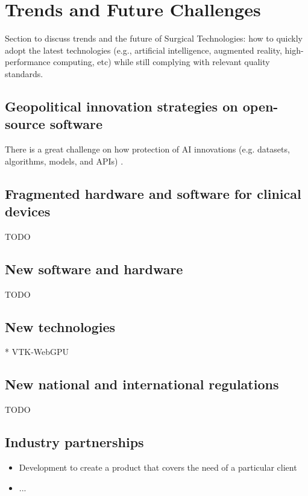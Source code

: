 \documentclass{article}
\begin{document}
\section{Trends and Future Challenges}
Section to discuss trends and the future of Surgical Technologies: how to quickly adopt the latest technologies (e.g., artificial intelligence, augmented reality, high-performance computing, etc) while still complying with relevant quality standards.

\subsection{Geopolitical innovation strategies on open-source software}
There is a great challenge on how protection of AI innovations (e.g. datasets, algorithms, models, and APIs) \cite{munozferrandis2022-open-sourcing-ai}.

\subsection{Fragmented hardware and software for clinical devices}
TODO

\subsection{New software and hardware}
TODO


\subsection{New technologies}
* VTK-WebGPU


\subsection{New national and international regulations}
TODO

\subsection{Industry partnerships}
\begin{itemize}
    \item Development to create a product that covers the need of a particular client
    \item ...
\end{itemize}
\end{document}
